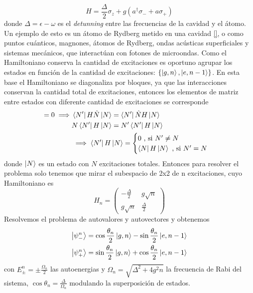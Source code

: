 \begin{equation}\label{eq3:hamiltoniano jcm}
    H=\frac{\Delta}{2}\sigma_z+g(a^\dagger \sigma_-+a \sigma_+)
\end{equation}
donde $\Delta = \epsilon - \omega$ es el \textit{detunning} entre las frecuencias de la cavidad y el átomo. Un ejemplo de esto es un átomo de Rydberg metido en una cavidad \ref{}, o como puntos cuánticos, magnones, átomos de Rydberg, ondas acústicas superficiales y sistemas mecánicos, que interactúan con fotones de microondas.
Como el Hamiltoniano conserva la cantidad de excitaciones es oportuno agrupar los estados en funci\'on de la cantidad de excitaciones: $\{\ket{g,n},\ket{e,n-1}\}$. En esta base el Hamiltoniano se diagonaliza por bloques, ya que las interacciones conservan la cantidad total de excitaciones, entonces los elementos de matriz entre estados con diferente cantidad de excitaciones se corresponde
\begin{align*}
    [H,\hat N]=0 \implies & \bra{N'}H \hat N \ket{N} = \bra{N'}\hat N H \ket{N} \\
    & N \bra{N'}H  \ket{N} = N' \bra{N'}H \ket{N} \\
    & \implies \bra{N'}H \ket{N} = \begin{cases}
        0 \text{ , si } N' \neq N \\
        \bra{N}H \ket{N} \text{ , si } N'=N
    \end{cases}
\end{align*}
donde $\ket{N}$ es un estado con $N$ excitaciones totales. Entonces para resolver el problema solo tenemos que mirar el subespacio de 2x2 de n excitaciones, cuyo Hamiltoniano es
\begin{equation}
    H_n=\begin{pmatrix}
        -\frac{\Delta}{2} & g \sqrt{n} \\
        g \sqrt{n} & \frac{\Delta}{2} 
    \end{pmatrix}
\end{equation}
Resolvemos el problema de autovalores y autovectores y obtenemos
\begin{equation}
    \begin{aligned}
        \ket{\psi^n_-} & = \cos \frac{\theta_n}{2}\ket{g,n}-\sin \frac{\theta_n}{2}\ket{e,n-1} \\
        \ket{\psi^n_+} & = \sin \frac{\theta_n}{2}\ket{g,n}+\cos \frac{\theta_n}{2}\ket{e,n-1}        
    \end{aligned}
\end{equation}
con $E_{\pm}^n=\pm \frac{\Omega_n}{2}$ las autoenergias y $\Omega_n=\sqrt{\Delta^2+4g^2n}$ la frecuencia de Rabi del sistema, $\cos \theta_n=\frac{\Delta}{\Omega_n}$ modulando la superposici\'on de estados. 
